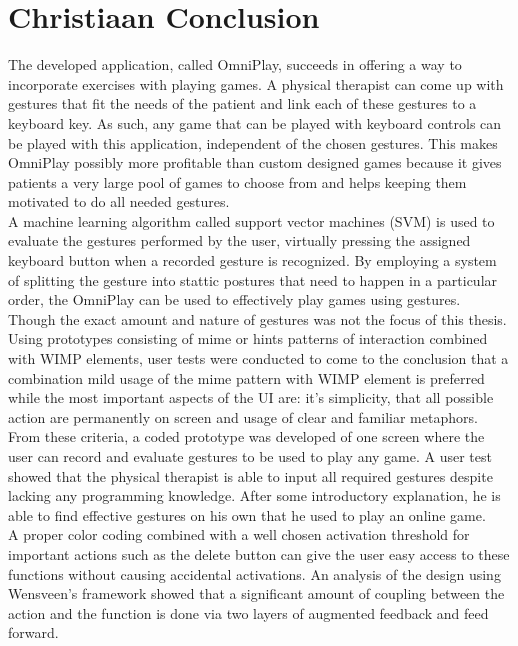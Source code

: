 \chapter{Christiaan Conclusion}

The developed application, called OmniPlay, succeeds in offering a way to incorporate exercises with playing games. A physical therapist can come up with gestures that fit the needs of the patient and link each of these gestures to a keyboard key. As such, any game that can be played with keyboard controls can be played with this application, independent of the chosen gestures. This makes OmniPlay possibly more profitable than custom designed games because it gives patients a very large pool of games to choose from and helps keeping them motivated to do all needed gestures.\\

A machine learning algorithm called support vector machines (SVM) is used to evaluate the gestures performed by the user, virtually pressing the assigned keyboard button when a recorded gesture is recognized. By employing a system of splitting the gesture into stattic postures that need to happen in a particular order, the OmniPlay can be used to effectively play games using gestures. Though the exact amount and nature of gestures was not the focus of this thesis.\\

Using prototypes consisting of mime or hints patterns of interaction combined with WIMP elements, user tests were conducted to come to the conclusion that a combination mild usage of the mime pattern with WIMP element is preferred while the most important aspects of the UI are: it's simplicity, that all possible action are permanently on screen and usage of clear and familiar metaphors. From these criteria, a coded prototype was developed of one screen where the user can record and evaluate gestures to be used to play any game. A user test showed that the physical therapist is able to input all required gestures despite lacking any programming knowledge. After some introductory explanation, he is able to find effective gestures on his own that he used to play an online game.  \\


A proper color coding combined with a well chosen  activation threshold for important actions such as the delete button can give the user easy access to these functions without causing accidental activations. An analysis of the design using Wensveen's framework showed that a significant amount of coupling between the action and the function is done via two layers of augmented feedback and feed forward.
